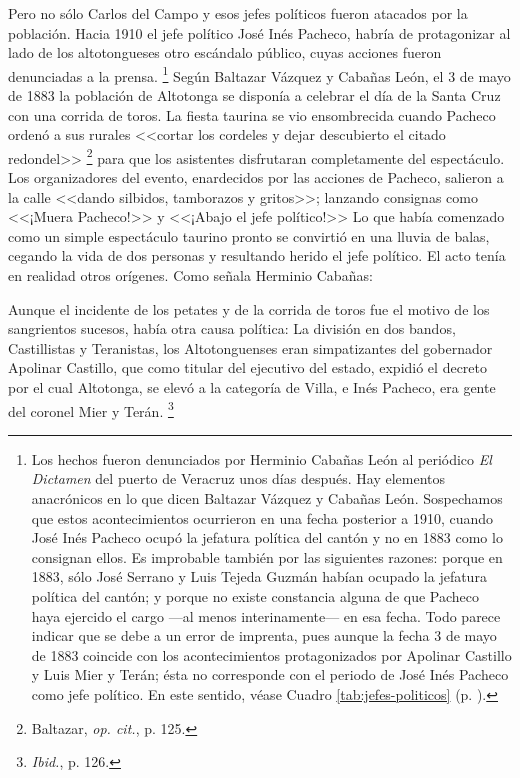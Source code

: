 \documentclass[14pt,twoside,final]{extbook} %
\let\oldfootnote\footnote
\renewcommand\footnote[1]{%
\oldfootnote{\hspace{1mm}#1}}
\begin{document}
Pero no sólo Carlos del Campo y esos jefes políticos fueron atacados por la población. Hacia 1910 el jefe político José Inés Pacheco, habría de protagonizar al lado de los altotongueses otro escándalo público, cuyas acciones fueron denunciadas a la prensa.\footnote{Los hechos fueron denunciados por Herminio Cabañas León al periódico \emph{El Dictamen} del puerto de Veracruz unos días después. Hay elementos anacrónicos en lo que dicen Baltazar Vázquez y Cabañas León. Sospechamos que estos acontecimientos ocurrieron en una fecha posterior a 1910, cuando José Inés Pacheco ocupó la jefatura política del cantón y no en 1883 como lo consignan ellos. Es improbable también por las siguientes razones: porque en 1883, sólo José Serrano y Luis Tejeda Guzmán habían ocupado la jefatura política del cantón; y porque no existe constancia alguna de que Pacheco haya ejercido el cargo ---al menos interinamente--- en esa fecha. Todo parece indicar que se debe a un error de imprenta, pues aunque la fecha 3 de mayo de 1883 coincide con los acontecimientos protagonizados por Apolinar Castillo y Luis Mier y Terán; ésta no corresponde con el periodo de José Inés Pacheco como jefe político. En este sentido, véase Cuadro \ref{tab:jefes-politicos} (p. \pageref{tab:jefes-politicos}).} Según Baltazar Vázquez y Cabañas León, el 3 de mayo de 1883 la población de Altotonga se disponía a celebrar el día de la Santa Cruz con una corrida de toros. La fiesta taurina se vio ensombrecida cuando Pacheco ordenó a sus rurales <<cortar los cordeles y dejar descubierto el citado redondel>>\footnote{Baltazar, \emph{op. cit.}, p. 125.} para que los asistentes disfrutaran completamente del espectáculo. Los organizadores del evento, enardecidos por las acciones de Pacheco, salieron a la calle <<dando silbidos, tamborazos y gritos>>; lanzando consignas como <<¡Muera Pacheco!>> y <<¡Abajo el jefe político!>> Lo que había comenzado como un simple espectáculo taurino pronto se convirtió en una lluvia de balas, cegando la vida de dos personas y resultando herido el jefe político. El acto tenía en realidad otros orígenes. Como señala Herminio Cabañas:
\begin{quoting}
Aunque el incidente de los petates y de la corrida de toros fue el motivo de los sangrientos sucesos, había otra causa política: La división en dos bandos, Castillistas y Teranistas, los Altotonguenses eran simpatizantes del gobernador Apolinar Castillo, que como titular del ejecutivo del estado, expidió el decreto por el cual Altotonga, se elevó a la categoría de Villa, e Inés Pacheco, era gente del coronel Mier y Terán.\footnote{\emph{Ibid.}, p. 126.}
\end{quoting}
\end{document}
